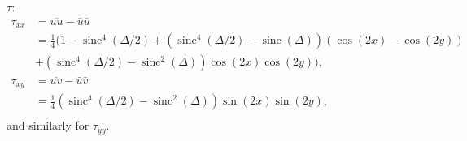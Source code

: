 \documentclass[preprint]{elsarticle}
\newcommand{\sinc}{\operatorname{sinc}}
\begin{document}
$\tau$:
\begin{equation}
    \begin{split}
        \tau_{x x}
        &= \overline{u u} - \bar{u} \bar{u} \\
        & = \frac{1}{4} \Big(
        1 - \sinc^4(\Delta / 2)
        + (\sinc^4(\Delta / 2) - \sinc(\Delta)) (\cos(2 x) - \cos(2 y)) \\
        & + (\sinc^4(\Delta / 2) - \sinc^2(\Delta)) \cos(2 x) \cos(2 y) \Big)
        , \\
        \tau_{x y}
        & = \overline{u v} - \bar{u} \bar{v} \\
        & =
        \frac{1}{4} (\sinc^4(\Delta / 2) - \sinc^2(\Delta))
        \sin(2 x) \sin(2 y), \\
    \end{split}
\end{equation}
and similarly for $\tau_{y y}$.
\end{document}
